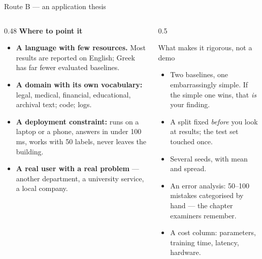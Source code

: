\documentclass[aspectratio=169,11pt]{beamer}
\newcommand{\key}[1]{\textbf{\color{brand}#1}}
\begin{document}
\begin{frame}{Route B --- an application thesis}
\begin{columns}[T]
\begin{column}{0.48\textwidth}
\textbf{Where to point it}
\footnotesize
\begin{itemize}
  \item \key{A language with few resources.} Most results are reported on
        English; Greek has far fewer evaluated baselines.
  \item \key{A domain with its own vocabulary:} legal, medical, financial,
        educational, archival text; code; logs.
  \item \key{A deployment constraint:} runs on a laptop or a phone, answers in
        under 100\,ms, works with 50 labels, never leaves the building.
  \item \key{A real user with a real problem} --- another department, a
        university service, a local company.
\end{itemize}
\end{column}
\begin{column}{0.5\textwidth}
\begin{block}{What makes it rigorous, not a demo}
\footnotesize
\begin{itemize}
  \item Two baselines, one embarrassingly simple. If the simple one wins, that
        \emph{is} your finding.
  \item A split fixed \emph{before} you look at results; the test set touched
        once.
  \item Several seeds, with mean and spread.
  \item An error analysis: 50--100 mistakes categorised by hand --- the chapter
        examiners remember.
  \item A cost column: parameters, training time, latency, hardware.
\end{itemize}
\end{block}
\end{column}
\end{columns}
\end{frame}
\end{document}
